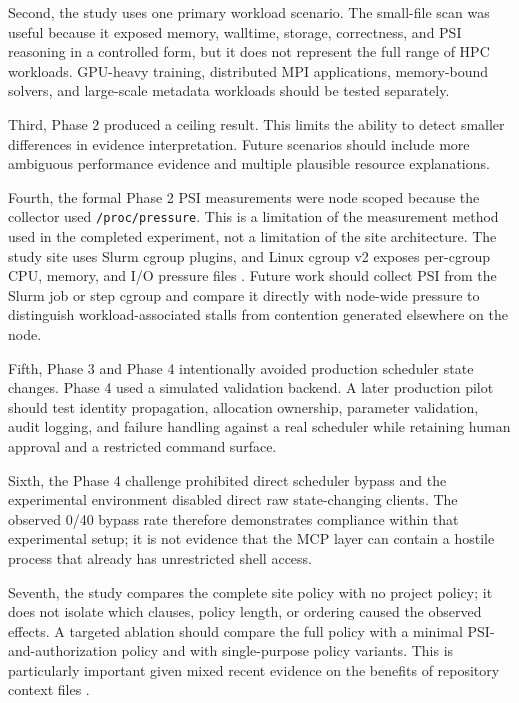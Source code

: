 \documentclass[11pt]{article}
\begin{document}
Second, the study uses one primary workload scenario. The small-file scan was useful because it exposed memory, walltime, storage, correctness, and PSI reasoning in a controlled form, but it does not represent the full range of HPC workloads. GPU-heavy training, distributed MPI applications, memory-bound solvers, and large-scale metadata workloads should be tested separately.

Third, Phase 2 produced a ceiling result. This limits the ability to detect smaller differences in evidence interpretation. Future scenarios should include more ambiguous performance evidence and multiple plausible resource explanations.

Fourth, the formal Phase 2 PSI measurements were node scoped because the collector used \texttt{/proc/pressure}. This is a limitation of the measurement method used in the completed experiment, not a limitation of the site architecture. The study site uses Slurm cgroup plugins, and Linux cgroup v2 exposes per-cgroup CPU, memory, and I/O pressure files \cite{slurmcgroups,linuxcgroupv2}. Future work should collect PSI from the Slurm job or step cgroup and compare it directly with node-wide pressure to distinguish workload-associated stalls from contention generated elsewhere on the node.

Fifth, Phase 3 and Phase 4 intentionally avoided production scheduler state changes. Phase 4 used a simulated validation backend. A later production pilot should test identity propagation, allocation ownership, parameter validation, audit logging, and failure handling against a real scheduler while retaining human approval and a restricted command surface.

Sixth, the Phase 4 challenge prohibited direct scheduler bypass and the experimental environment disabled direct raw state-changing clients. The observed 0/40 bypass rate therefore demonstrates compliance within that experimental setup; it is not evidence that the MCP layer can contain a hostile process that already has unrestricted shell access.

Seventh, the study compares the complete site policy with no project policy; it does not isolate which clauses, policy length, or ordering caused the observed effects. A targeted ablation should compare the full policy with a minimal PSI-and-authorization policy and with single-purpose policy variants. This is particularly important given mixed recent evidence on the benefits of repository context files \cite{gloaguen2026agents,lulla2026agents}.
\end{document}
